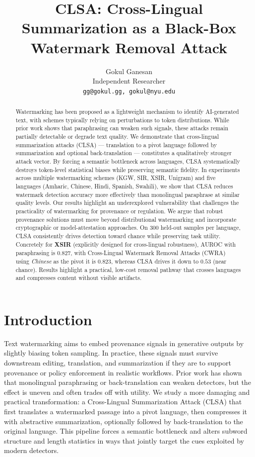 \documentclass{article}
\title{CLSA: Cross-Lingual Summarization as a Black-Box Watermark Removal Attack}
\author{Gokul Ganesan \\
  Independent Researcher \\
  \texttt{gg@gokul.gg, gokul@nyu.edu} \\
}
\begin{document}
\maketitle

\begin{abstract}
Watermarking has been proposed as a lightweight mechanism to identify AI-generated text, with schemes typically relying on perturbations to token distributions. While prior work shows that paraphrasing can weaken such signals, these attacks remain partially detectable or degrade text quality. We demonstrate that cross-lingual summarization attacks (CLSA) — translation to a pivot language followed by summarization and optional back-translation — constitutes a qualitatively stronger attack vector. By forcing a semantic bottleneck across languages, CLSA systematically destroys token-level statistical biases while preserving semantic fidelity. In experiments across multiple watermarking schemes (KGW, SIR, XSIR, Unigram) and five languages (Amharic, Chinese, Hindi, Spanish, Swahili), we show that CLSA reduces watermark detection accuracy more effectively than monolingual paraphrase at similar quality levels. Our results highlight an underexplored vulnerability that challenges the practicality of watermarking for provenance or regulation. We argue that robust provenance solutions must move beyond distributional watermarking and incorporate cryptographic or model-attestation approaches. On 300 held-out samples per language, CLSA consistently drives detection toward chance while preserving task utility. Concretely for \textbf{XSIR} (explicitly designed for cross-lingual robustness), AUROC with paraphrasing is $0.827$, with Cross-Lingual Watermark Removal Attacks (CWRA)~\citep{He2024cwra} using \emph{Chinese} as the pivot it is $0.823$, whereas CLSA drives it down to $0.53$ (near chance). Results highlight a practical, low-cost removal pathway that crosses languages and compresses content without visible artifacts.
\end{abstract}

\section{Introduction}

Text watermarking aims to embed provenance signals in generative outputs by slightly biasing token sampling. In practice, these signals must survive downstream editing, translation, and summarization if they are to support provenance or policy enforcement in realistic workflows. Prior work has shown that monolingual paraphrasing or back-translation can weaken detectors, but the effect is uneven and often trades off with utility. We study a more damaging and practical transformation: a Cross-Lingual Summarization Attack (CLSA) that first translates a watermarked passage into a pivot language, then compresses it with abstractive summarization, optionally followed by back-translation to the original language. This pipeline forces a semantic bottleneck and alters subword structure and length statistics in ways that jointly target the cues exploited by modern detectors.
\end{document}
